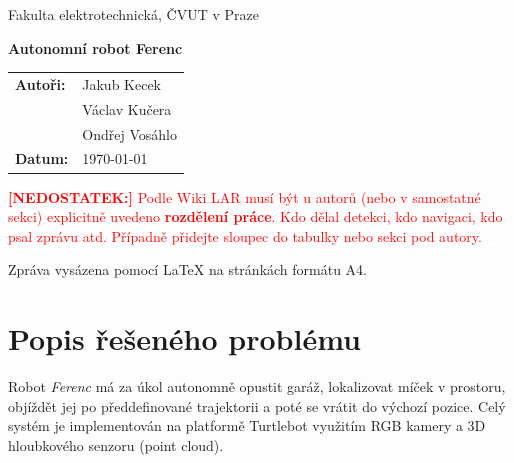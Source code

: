 \documentclass[12pt, a4paper, oneside]{article}
\newcommand{\NazevPrace}{Autonomní robot Ferenc}
\newcommand{\AutorC}{Ondřej Vosáhlo}
\newcommand{\AutorB}{Václav Kučera}
\newcommand{\Autorka}{Jakub Kecek}
\newcommand{\DatumOdevzdani}{\today}
\newcommand{\Ustav}{Fakulta elektrotechnická, ČVUT v Praze}
\begin{document}
\begin{titlepage}
  \centering
  \vspace*{2cm}

  {\Large \Ustav \par}
  \vspace{0.5cm}

  \vspace{3cm}

  {\Huge \bfseries \NazevPrace \par}

  \vspace{2cm}

  {\large
    \begin{tabular}{ll}
      \textbf{Autoři:}   & \Autorka \\
                         & \AutorB  \\
                         & \AutorC  \\[6pt]
      \textbf{Datum:}    & \DatumOdevzdani \\
    \end{tabular}
  }

  \vspace{1cm}
  \textcolor{red}{\textbf{[NEDOSTATEK:]} Podle Wiki LAR musí být u autorů (nebo v samostatné sekci) explicitně uvedeno \textbf{rozdělení práce}. Kdo dělal detekci, kdo navigaci, kdo psal zprávu atd. Případně přidejte sloupec do tabulky nebo sekci pod autory.}

  \vfill

  {\small Zpráva vysázena pomocí \LaTeX{} na stránkách formátu A4.}
\end{titlepage}

\tableofcontents
\newpage

\section{Popis řešeného problému}
\label{sec:popis}

Robot \textit{Ferenc} má za úkol autonomně opustit garáž, lokalizovat míček
v prostoru, objíždět jej po předdefinované trajektorii a poté se vrátit
do výchozí pozice. Celý systém je implementován na platformě Turtlebot využitím RGB kamery a 3D hloubkového senzoru (point cloud).
\end{document}
